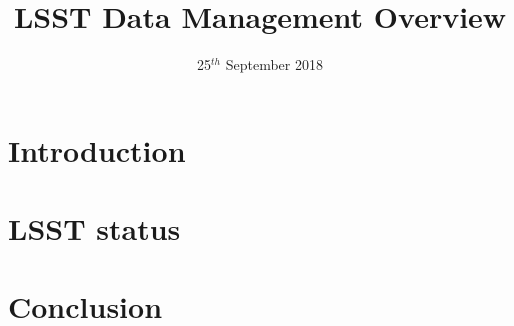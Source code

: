 \documentclass[t,aspectratio=169]{beamer}
\title{LSST Data Management Overview  }
\date{25$^{th}$ September 2018}
\begin{document}
\maketitle
\section{Introduction}

\section{LSST status}



\section{Conclusion}


\appendix

\end{document}
